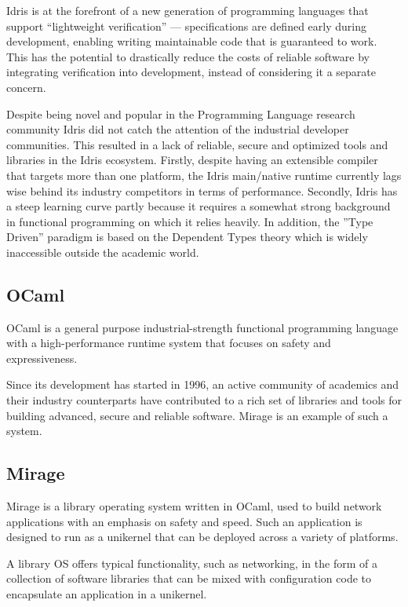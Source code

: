 \documentclass[a4paper]{report}
\begin{document}
Idris is at the forefront of a new generation of programming languages
that support “lightweight verification” --- specifications are defined
early during development, enabling writing maintainable code that is
guaranteed to work.
This has the potential to drastically reduce the costs of reliable software by
integrating verification into development, instead of considering it a separate
concern.

Despite being novel and popular in the Programming Language research community
Idris did not catch the attention of the industrial developer communities.
This resulted in a lack of reliable, secure and optimized tools and libraries
in the Idris ecosystem.
Firstly, despite having an extensible compiler that targets more than one
platform, the Idris main/native runtime currently lags wise behind
its industry competitors in terms of performance.
Secondly, Idris has a steep learning curve partly because it requires
a somewhat strong background in functional programming on which it relies
heavily.
In addition, the ''Type Driven'' paradigm is based on the Dependent Types
theory which is widely inaccessible outside the academic world.

\subsection{OCaml}
OCaml is a general purpose industrial-strength functional programming language
with a high-performance runtime system that focuses on safety and
expressiveness.

Since its development has started in 1996, an active community of
academics and their industry counterparts have contributed to a rich set of
libraries and tools for building advanced, secure and reliable software. Mirage
is an example of such a system.

\subsection{Mirage}
Mirage is a library operating system written in OCaml, used to build network
applications with an emphasis on safety and speed.
Such an application is designed to run as a unikernel that can be deployed
across a variety of platforms.

A library OS offers typical functionality, such as networking,
in the form of a collection of software libraries that can be mixed with
configuration code to encapsulate an application in a unikernel.
\end{document}
